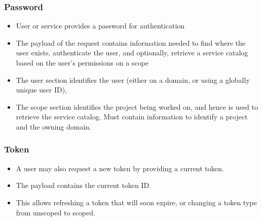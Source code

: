 \documentclass{article}
\begin{document}
\subsubsection{Password}
\begin{itemize}
    \item User or service provides a password for authentication
    
    \item The payload of the request contains information needed to find where the user exists, authenticate the user, and optionally, retrieve a service catalog based on the user’s permissions on a scope
    
    \item The user section identifies the user (either on a domain, or using a globally unique user ID), 
    
    \item The scope section identifies the project being worked on, and hence is used to retrieve the service catalog. Must contain information to identify a project and the owning domain. 
\end{itemize}

\subsubsection{Token}
\begin{itemize}
    \item A user may also request a new token by providing a current token.
    
    \item The payload contains the current token ID. 
    
    \item This allows refreshing a token that will soon expire, or changing a token type from unscoped to scoped. 
\end{itemize}
\end{document}
